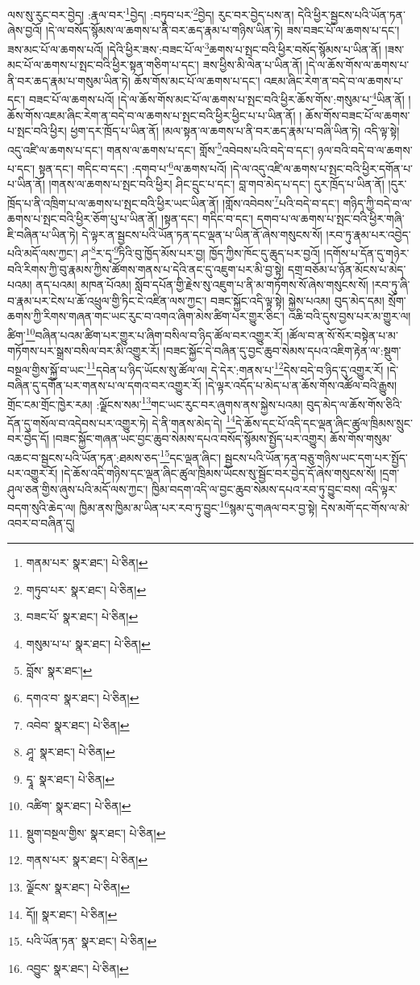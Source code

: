 ལས་སུ་རུང་བར་བྱེད། :རྣལ་བར་\footnote{གནམ་པར་  སྣར་ཐང་།  པེ་ཅིན། }བྱེད། :བཏུབ་པར་\footnote{གཏུབ་པར་  སྣར་ཐང་།  པེ་ཅིན། }བྱེད། རུང་བར་བྱེད་པས་ན། དེའི་ཕྱིར་སྦྱངས་པའི་ཡོན་ཏན་ཞེས་བྱའོ། །དེ་ལ་བསོད་སྙོམས་ལ་ཆགས་པ་ནི་བར་ཆད་རྣམ་པ་གཉིས་ཡིན་ཏེ། ཟས་བཟང་པོ་ལ་ཆགས་པ་དང་། ཟས་མང་པོ་ལ་ཆགས་པའོ། །དེའི་ཕྱིར་ཟས་:བཟང་པོ་ལ་\footnote{བཟང་པོ་  སྣར་ཐང་།  པེ་ཅིན། }ཆགས་པ་སྤང་བའི་ཕྱིར་བསོད་སྙོམས་པ་ཡིན་ནོ། །ཟས་མང་པོ་ལ་ཆགས་པ་སྤང་བའི་ཕྱིར་སྟན་གཅིག་པ་དང་། ཟས་ཕྱིས་མི་ལེན་པ་ཡིན་ནོ། །དེ་ལ་ཆོས་གོས་ལ་ཆགས་པ་ནི་བར་ཆད་རྣམ་པ་གསུམ་ཡིན་ཏེ། ཆོས་གོས་མང་པོ་ལ་ཆགས་པ་དང་། འཇམ་ཞིང་རེག་ན་བདེ་བ་ལ་ཆགས་པ་དང་། བཟང་པོ་ལ་ཆགས་པའོ། །དེ་ལ་ཆོས་གོས་མང་པོ་ལ་ཆགས་པ་སྤང་བའི་ཕྱིར་ཆོས་གོས་:གསུམ་པ་\footnote{གསུམ་པ་པ་  སྣར་ཐང་།  པེ་ཅིན། }ཡིན་ནོ། །ཆོས་གོས་འཇམ་ཞིང་རེག་ན་བདེ་བ་ལ་ཆགས་པ་སྤང་བའི་ཕྱིར་ཕྱིང་པ་པ་ཡིན་ནོ། །
ཆོས་གོས་བཟང་པོ་ལ་ཆགས་པ་སྤང་བའི་ཕྱིར། ཕྱག་དར་ཁྲོད་པ་ཡིན་ནོ། །མལ་སྟན་ལ་ཆགས་པ་ནི་བར་ཆད་རྣམ་པ་བཞི་ཡིན་ཏེ། འདི་ལྟ་སྟེ། འདུ་འཛི་ལ་ཆགས་པ་དང་། གནས་ལ་ཆགས་པ་དང་། གློས་\footnote{བློས་  སྣར་ཐང་། }འབེབས་པའི་བདེ་བ་དང་། ཉལ་བའི་བདེ་བ་ལ་ཆགས་པ་དང་། སྟན་དང་། གདིང་བ་དང་། :དགབ་པ་\footnote{དགའ་བ་  སྣར་ཐང་།  པེ་ཅིན། }ལ་ཆགས་པའོ། །དེ་ལ་འདུ་འཛི་ལ་ཆགས་པ་སྤང་བའི་ཕྱིར་དགོན་པ་པ་ཡིན་ནོ། །གནས་ལ་ཆགས་པ་སྤང་བའི་ཕྱིར། ཤིང་དྲུང་པ་དང་། བླ་གབ་མེད་པ་དང་། དུར་ཁྲོད་པ་ཡིན་ནོ། །དུར་ཁྲོད་པ་ནི་འཁྲིག་པ་ལ་ཆགས་པ་སྤང་བའི་ཕྱིར་ཡང་ཡིན་ནོ། །གློས་འབེབས་\footnote{འབེབ་  སྣར་ཐང་།  པེ་ཅིན། }པའི་བདེ་བ་དང་། གཉིད་ཀྱི་བདེ་བ་ལ་ཆགས་པ་སྤང་བའི་ཕྱིར་ཅོག་པུ་པ་ཡིན་ནོ། །སྟན་དང་། གདིང་བ་དང་། དགབ་པ་ལ་ཆགས་པ་སྤང་བའི་ཕྱིར་གཞི་ཇི་བཞིན་པ་ཡིན་ཏེ། དེ་ལྟར་ན་སྦྱངས་པའི་ཡོན་ཏན་དང་ལྡན་པ་ཡིན་ནོ་ཞེས་གསུངས་སོ། །རབ་ཏུ་རྣམ་པར་འབྱེད་པའི་མདོ་ལས་ཀྱང་། ཤ་\footnote{ཤཱ་  སྣར་ཐང་།  པེ་ཅིན། }ར་དྭ་\footnote{དྭཱ་  སྣར་ཐང་།  པེ་ཅིན། }ཏིའི་བུ་ཁྱོད་མོས་པར་བྱ། ཁྱོད་ཀྱིས་ཁོང་དུ་ཆུད་པར་བྱའོ། །དགོས་པ་དོན་དུ་གཉེར་བའི་རིགས་ཀྱི་བུ་རྣམས་ཀྱིས་ཚོགས་གནས་པ་དེའི་ནང་དུ་འཇུག་པར་མི་བྱ་སྟེ། དགྲ་བཅོམ་པ་ཉོན་མོངས་པ་མེད་པའམ། ནད་པའམ། མཁན་པོའམ། སློབ་དཔོན་གྱི་རྗེས་སུ་འཇུག་པ་ནི་མ་གཏོགས་སོ་ཞེས་གསུངས་སོ། །རབ་ཏུ་ཞི་བ་རྣམ་པར་ངེས་པ་ཆོ་འཕྲུལ་གྱི་ཏིང་ངེ་འཛིན་ལས་ཀྱང་། བཟང་སྐྱོང་འདི་ལྟ་སྟེ། སྐྱེས་པའམ། བུད་མེད་དམ། སྲོག་ཆགས་ཀྱི་རིགས་གཞན་གང་ཡང་རུང་བ་འགའ་ཞིག་མེས་ཚིག་པར་གྱུར་ཅིང་། འཆི་བའི་དུས་བྱས་པར་མ་གྱུར་ལ། ཚིག་\footnote{འཚིག་  སྣར་ཐང་།  པེ་ཅིན། }བཞིན་པའམ་ཚིག་པར་གྱུར་པ་ཞིག་བསིལ་བ་ཉིད་ཚོལ་བར་འགྱུར་རོ། །ཚོལ་བ་ན་སོ་སོར་བསྟེན་པ་མ་གཏོགས་པར་སྒྲས་བསིལ་བར་མི་འགྱུར་རོ། །བཟང་སྐྱོང་དེ་བཞིན་དུ་བྱང་ཆུབ་སེམས་དཔའ་འཇིག་རྟེན་ལ་:སྡུག་བསྔལ་གྱིས་སྐྱོ་བ་ཡང་\footnote{སྡུག་བསྔལ་གྱིས་  སྣར་ཐང་།  པེ་ཅིན། }དབེན་པ་ཉིད་ཡོངས་སུ་ཚོལ་ལ། དེ་དེར་:གནས་པ་\footnote{གནས་པར་  སྣར་ཐང་།  པེ་ཅིན། }དེས་བདེ་བ་ཉིད་དུ་འགྱུར་རོ། །དེ་བཞིན་དུ་དགོན་པར་གནས་པ་ལ་དགའ་བར་འགྱུར་རོ། །དེ་ལྟར་འདོད་པ་མེད་པ་ན་ཆོས་གོས་འཚོལ་བའི་རྒྱུས། གྲོང་ངམ་གྲོང་ཁྱེར་རམ། :ལྗོངས་སམ་\footnote{ལྗོངས་  སྣར་ཐང་།  པེ་ཅིན། }གང་ཡང་རུང་བར་ཞུགས་ནས་སྐྱེས་པའམ། བུད་མེད་ལ་ཆོས་གོས་ཅིའི་དོན་དུ་གསོལ་བ་འདེབས་པར་འགྱུར་ཏེ། དེ་ནི་གནས་མེད་དེ། \footnote{དོ།།   སྣར་ཐང་།  པེ་ཅིན། }དེ་ཆོས་དང་པོ་འདི་དང་ལྡན་ཞིང་ཚུལ་ཁྲིམས་སྲུང་བར་བྱེད་དོ། །བཟང་སྐྱོང་གཞན་ཡང་བྱང་ཆུབ་སེམས་དཔའ་བསོད་སྙོམས་སྤྱོད་པར་འགྱུར། ཆོས་གོས་གསུམ་འཆང་བ་སྦྱངས་པའི་ཡོན་ཏན་:ཐམས་ཅད་\footnote{པའི་ཡོན་ཏན་  སྣར་ཐང་།  པེ་ཅིན། }དང་ལྡན་ཞིང་། སྦྱངས་པའི་ཡོན་ཏན་བཅུ་གཉིས་ཡང་དག་པར་སྤྱོད་པར་འགྱུར་རོ། །དེ་ཆོས་འདི་གཉིས་དང་ལྡན་ཞིང་ཚུལ་ཁྲིམས་ཡོངས་སུ་སྦྱོང་བར་བྱེད་དོ་ཞེས་གསུངས་སོ། །དྲག་ཤུལ་ཅན་གྱིས་ཞུས་པའི་མདོ་ལས་ཀྱང་། ཁྱིམ་བདག་འདི་ལ་བྱང་ཆུབ་སེམས་དཔའ་རབ་ཏུ་བྱུང་བས། འདི་ལྟར་བདག་སུའི་ཆེད་ལ། ཁྱིམ་ནས་ཁྱིམ་མ་ཡིན་པར་རབ་ཏུ་བྱུང་\footnote{འབྱུང་  སྣར་ཐང་།  པེ་ཅིན། }སྙམ་དུ་གཞལ་བར་བྱ་སྟེ། དེས་མགོ་དང་གོས་ལ་མེ་འབར་བ་བཞིན་དུ། 